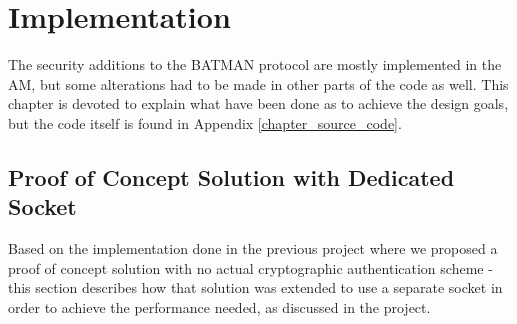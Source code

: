 \chapter{Implementation}\label{chapter_implementation}

The security additions to the BATMAN protocol are mostly implemented in the
\ac{AM}, but some alterations had to be made in other parts of the code as well.
This chapter is devoted to explain what have been done as to achieve the design
goals, but the code itself is found in Appendix \ref{chapter_source_code}.

\section{Proof of Concept Solution with Dedicated Socket}
Based on the implementation done in the previous project where we proposed a
proof of concept solution with no actual cryptographic authentication scheme -
this section describes how that solution was extended to use a separate socket
in order to achieve the performance needed, as discussed in the project.
